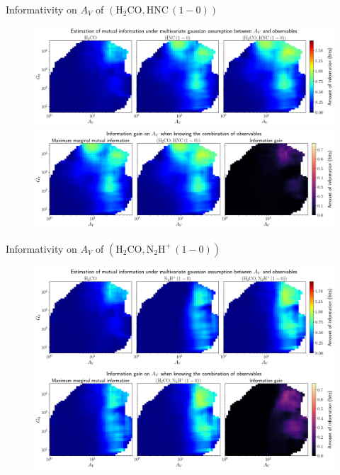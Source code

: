 \documentclass{beamer}
\begin{document}
\begin{frame}{Informativity on $A_V$ of $\left(\mathrm{H_2CO},\mathrm{HNC\,(1-0)}\right)$}
    \begin{figure}
        \centering
        \includegraphics[width=0.95\linewidth]{../linearinfo/av__h2co_hnc10_linearinfo.png}
        \vfill
        \includegraphics[width=0.95\linewidth]{../linearinfo/av__h2co_hnc10_linearinfo_gain.png}
    \end{figure}
\end{frame}

\begin{frame}{Informativity on $A_V$ of $\left(\mathrm{H_2CO},\mathrm{N_2H^+\,(1-0)}\right)$}
    \begin{figure}
        \centering
        \includegraphics[width=0.95\linewidth]{../linearinfo/av__h2co_n2hp10_linearinfo.png}
        \vfill
        \includegraphics[width=0.95\linewidth]{../linearinfo/av__h2co_n2hp10_linearinfo_gain.png}
    \end{figure}
\end{frame}
\end{document}

